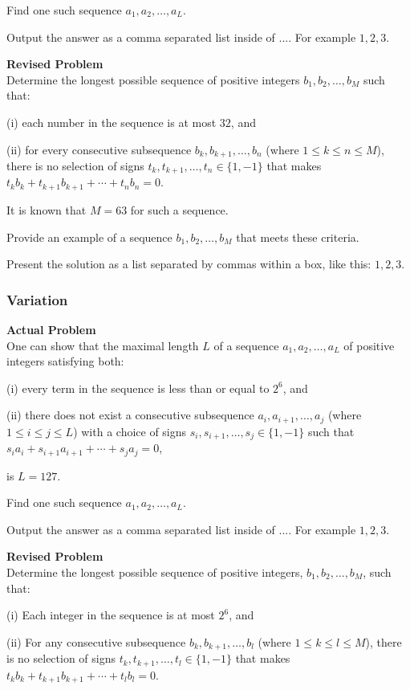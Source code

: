 Find one such sequence $a_1, a_2, \ldots, a_L$.

Output the answer as a comma separated list inside of $\boxed{...}$. For example $\boxed{1, 2, 3}$.

\textbf{Revised Problem}\\
Determine the longest possible sequence of positive integers \( b_1, b_2, \ldots, b_M \) such that:

(i) each number in the sequence is at most \( 32 \), and

(ii) for every consecutive subsequence \( b_k, b_{k+1}, \ldots, b_{n} \) (where \( 1 \leq k \leq n \leq M \)), there is no selection of signs \( t_k, t_{k+1}, \ldots, t_{n} \in \{1, -1\} \) that makes \( t_k b_k + t_{k+1} b_{k+1} + \cdots + t_{n} b_{n} = 0 \).

It is known that \( M = 63 \) for such a sequence.

Provide an example of a sequence \( b_1, b_2, \ldots, b_M \) that meets these criteria.

Present the solution as a list separated by commas within a box, like this: \(\boxed{1, 2, 3}\).

\subsubsection{Variation}
\textbf{Actual Problem}\\
One can show that the maximal length $L$ of a sequence $a_1, a_2, \ldots, a_L$ of positive integers satisfying both:

(i) every term in the sequence is less than or equal to $2^6$, and

(ii) there does not exist a consecutive subsequence $a_i, a_{i+1}, \ldots, a_{j}$ (where $1 \leq i \leq j \leq L$) with
a choice of signs $s_i, s_{i+1}, \ldots, s_{j} \in \{1, -1\}$ such that $s_i a_i + s_{i+1} a_{i+1} + \cdots + s_{j} a_{j} = 0$,

is $L = 127$.

Find one such sequence $a_1, a_2, \ldots, a_L$.

Output the answer as a comma separated list inside of $\boxed{...}$. For example $\boxed{1, 2, 3}$.

\textbf{Revised Problem}\\
Determine the longest possible sequence of positive integers, \( b_1, b_2, \ldots, b_M \), such that:

(i) Each integer in the sequence is at most \(2^6\), and

(ii) For any consecutive subsequence \( b_k, b_{k+1}, \ldots, b_l \) (where \(1 \leq k \leq l \leq M\)), there is no selection of signs \( t_k, t_{k+1}, \ldots, t_l \in \{1, -1\} \) that makes \( t_k b_k + t_{k+1} b_{k+1} + \cdots + t_l b_l = 0 \).

